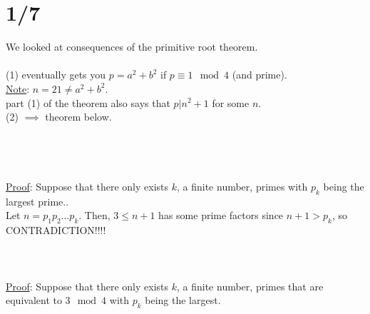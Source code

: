 \section*{1/7}
  We looked at consequences of the primitive root theorem.\\
  \\
  (1) eventually gets you $p = a^2 + b^2$ if $p \equiv 1 \mod 4$ (and prime).\\
  \underline{Note}: $n = 21 \not= a^2 + b^2$.\\
  part (1) of the theorem also says that $p | n^2 + 1$ for some $n$.\\
  (2) $\implies$ theorem below.\\
  \\\\
  \\\\
  \underline{Proof}: Suppose that there only exists $k$, a finite number, 
  primes with $p_k$ being the largest prime..\\
  Let $n = p_1p_2\ldots p_k$. Then, $3 \le n +1$ has some prime factors since
  $n +1 > p_k$, so CONTRADICTION!!!!\\\\
  \\\\
  \underline{Proof}: Suppose that there only exists $k$, a finite number, 
  primes that are equivalent to $3 \mod 4$ with $p_k$ being the largest.\\
